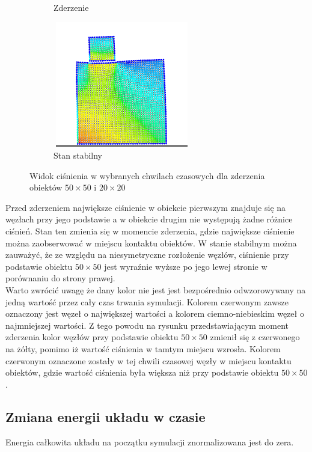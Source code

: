 \documentclass[12pt, letterpaper]{report}
\begin{document}
\begin{figure}[h]
\begin{subfigure}{0.5\textwidth}
            \caption{Zderzenie}
        \end{subfigure}
        \begin{subfigure}{0.5\textwidth}
            \centering
            \includegraphics[width=6cm, height=5.5cm]{pressure02_04}
            \caption{Stan stabilny}
        \end{subfigure}
        
        \caption{Widok ciśnienia w wybranych chwilach czasowych dla zderzenia obiektów $50 \times 50$ i $20 \times 20$}
    \end{figure}

    Przed zderzeniem największe ciśnienie w obiekcie pierwszym znajduje się na węzłach przy jego podstawie 
    a w obiekcie drugim nie występują żadne różnice ciśnień. Stan ten zmienia się w momencie zderzenia, 
    gdzie największe ciśnienie można zaobserwować w miejscu kontaktu obiektów. W stanie stabilnym 
    można zauważyć, że ze względu na niesymetryczne rozłożenie węzłów, ciśnienie przy podstawie 
    obiektu $50 \times 50$ jest wyraźnie wyższe po jego lewej stronie w porównaniu do strony prawej. \\

    Warto zwrócić uwagę że dany kolor nie jest jest bezpośrednio odwzorowywany na jedną wartość przez cały
    czas trwania symulacji. Kolorem czerwonym zawsze oznaczony jest węzeł o największej wartości a 
    kolorem ciemno-niebieskim węzeł o najmniejszej wartości. Z tego powodu na rysunku
    przedstawiającym moment zderzenia kolor węzłów przy podstawie obiektu $50 \times 50$ zmienił się z 
    czerwonego na żółty, pomimo iż wartość ciśnienia w tamtym miejscu wzrosła. Kolorem 
    czerwonym oznaczone zostały w tej chwili czasowej węzły w miejscu kontaktu obiektów, gdzie wartość 
    ciśnienia była większa niż przy podstawie obiektu $50 \times 50$.

    \subsection{Zmiana energii układu w czasie}
    Energia całkowita układu na początku symulacji znormalizowana jest do zera. 
\end{document}

